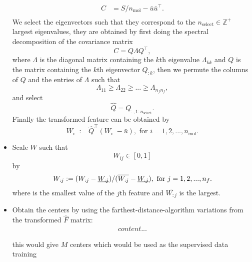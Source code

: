 \documentclass[12pt]{article}
\begin{document}
\begin{itemize}
\begin{equation}
\begin{split}
				C &= S/n_\text{mol} - \bar{u}\bar{u}^\top. \\			
			\end{split}
		\end{equation}
		We select the eigenvectors such that they correspond to the $n_\text{select} \in \mathbb{Z}^+$ largest eigenvalues, they are obtained by first doing the spectral decomposition of the covariance matrix
		\begin{equation}
			C = Q\Lambda Q^\top,
		\end{equation}
		where $\Lambda$ is the diagonal matrix containing the $k$th eigenvalue $\Lambda_{kk}$ and $Q$ is the matrix containing the $k$th eigenvector $Q_{:k}$, then we permute the columns of $Q$ and the entries of $\Lambda$ such that
		\begin{equation}
			\Lambda_{11} \geq \Lambda_{22} \geq  ... \geq \Lambda_{n_fn_f},
		\end{equation}
		and select
		\begin{equation}
			\hat{Q} = Q_{:, 1:n_\text{select}}.
		\end{equation}
		Finally the transformed feature can be obtained by
		\begin{equation}
			W_{i:} := \hat{Q}^\top(W_{i:} - \bar{u}), \text{ for }i = 1,2,...,n_\text{mol}.
		\end{equation}
	\item Scale $W$ such that 
	\begin{equation}
		W_{ij} \in [0, 1]
	\end{equation}
	by
	\begin{equation}
		\begin{split}
			W_{:j} := (W_{:j} - \underbar{$W_{:j}$})/ (\overline{W_{:j}} - \underbar{$W_{:j}$}), \text{ for } j = 1,2,..., n_f.
		\end{split}
	\end{equation}
	where  is the smallest value of the $j$th feature and $\overline{W_{:j}}$ is the largest.
	
    \item Obtain the centers by using the farthest-distance-algorithm variations from the transformed $\hat{F}$ matrix:
    	\begin{equation}
			\begin{split}
				content...
			\end{split}
    	\end{equation}
    
     this would give $M$ centers which would be used as the supervised data training
\end{itemize}
\end{document}
